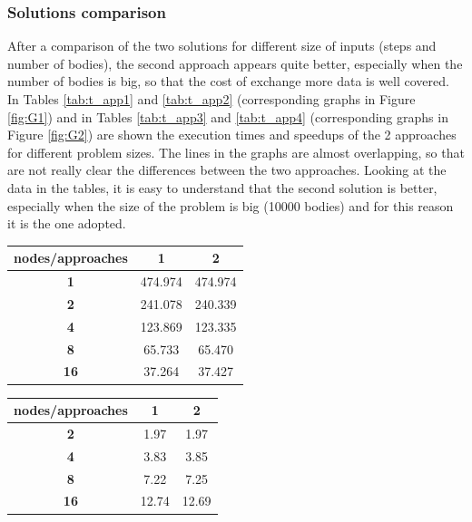 \documentclass[a4paper]{article}
\begin{document}
\subsubsection{Solutions comparison}
\label{sec:sol_comp}
 
After a comparison of the two solutions for different size of inputs (steps and number of bodies), the second approach appears quite better, especially when the number of bodies is big, so that the cost of exchange more data is well covered. In Tables \ref{tab:t_app1} and \ref{tab:t_app2} (corresponding graphs in Figure \ref{fig:G1}) and in Tables \ref{tab:t_app3} and \ref{tab:t_app4} (corresponding graphs in Figure \ref{fig:G2}) are shown the execution times and speedups of the 2 approaches for different problem sizes. The lines in the graphs are almost overlapping, so that are not really clear the differences between the two approaches. Looking at the data in the tables, it is easy to understand that the second solution is better, especially when the size of the problem is big (10000 bodies) and for this reason it is the one adopted.
\\


\begin{minipage}[b]{.40\textwidth}
  \centering
\begin{tabular}{c|c|c}
\centering
\textbf{nodes/approaches} & \textbf{1} & \textbf{2} \\ \hline
\textbf{1}                & 474.974    & 474.974    \\ \hline
\textbf{2}                & 241.078    & 240.339    \\ \hline
\textbf{4}                & 123.869    & 123.335    \\ \hline
\textbf{8}                & 65.733     & 65.470     \\ \hline
\textbf{16}               & 37.264     & 37.427    
\end{tabular}
  \label{tab:t_app1}
\end{minipage} \qquad
\begin{minipage}[b]{.40\textwidth}
  \centering
\begin{tabular}{c|c|c}
\textbf{nodes/approaches} & \textbf{1} & \textbf{2} \\ \hline
\textbf{2}                & 1.97       & 1.97       \\ \hline
\textbf{4}                & 3.83       & 3.85       \\ \hline
\textbf{8}                & 7.22       & 7.25       \\ \hline
\textbf{16}               & 12.74      & 12.69     
\end{tabular}
  \label{tab:t_app2}
\end{minipage}
\end{document}
